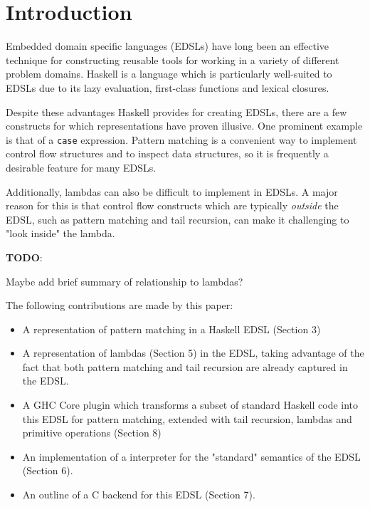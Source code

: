 \documentclass[sigplan,anonymous,review]{acmart}
\newcommand{\ttt}{\texttt}
\newenvironment{todo}
  {\begin{tcolorbox}
   \textbf{TODO}:
  }
  {\end{tcolorbox}
  }
\begin{document}



\maketitle

\section{Introduction}

Embedded domain specific languages (EDSLs) have long been an effective
technique for constructing reusable tools for working in a variety of
different problem domains. Haskell is a language which is particularly
well-suited to EDSLs due to its lazy evaluation, first-class functions and
lexical closures.

Despite these advantages Haskell provides for creating EDSLs, there are a few
constructs for which representations have proven illusive. One prominent example
is that of a \ttt{case} expression. Pattern matching is a convenient way to
implement control flow structures and to inspect data structures, so it is
frequently a desirable feature for many EDSLs.

Additionally, lambdas can also be difficult to implement in EDSLs. A major reason
for this is that control flow constructs which are typically \textit{outside} the EDSL,
such as pattern matching and tail recursion, can make it challenging to "look inside"
the lambda.
\begin{todo}
  Maybe add brief summary of relationship to lambdas?
\end{todo}

The following contributions are made by this paper:

\begin{itemize}
\item A representation of pattern matching in a Haskell EDSL (Section 3)
\item A representation of lambdas (Section 5) in the EDSL, taking advantage of
  the fact that both pattern matching and tail recursion are already captured in
  the EDSL.
\item A GHC Core plugin which transforms a subset of standard Haskell code
  into this EDSL for pattern matching, extended with tail recursion,
  lambdas and primitive operations (Section 8)
\item An implementation of a interpreter for the "standard" semantics of the EDSL (Section 6).
\item An outline of a C backend for this EDSL (Section 7).
\end{itemize}
\end{document}
